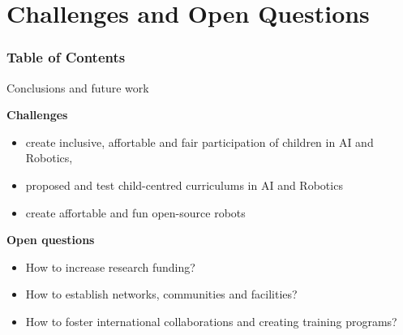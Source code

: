 \section{Challenges and Open Questions}


\begin{frame}
      \frametitle{Table of Contents}
      \tableofcontents[currentsection]
\end{frame}



{
\begin{frame}{Conclusions and future work}

\textbf{Challenges}   

\begin{itemize}
\item create inclusive, affortable and fair participation of children in AI and Robotics,
\item proposed and test child-centred curriculums in AI and Robotics 
\item create affortable and fun open-source robots 
\end{itemize}

\textbf{Open questions}
\begin{itemize}
\item How to increase research funding?
\item How to establish networks, communities and facilities?
\item How to foster international collaborations and creating training programs?
\end{itemize}




\end{frame}
}


